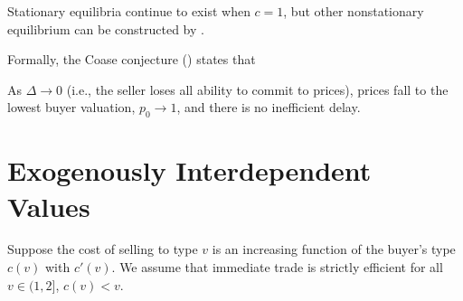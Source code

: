 \documentclass[11pt]{elegantbook}
\begin{document}
Stationary equilibria continue to exist when $c = 1$, but other nonstationary equilibrium can be constructed by \cite{ausubel1989reputation}.

Formally, the Coase conjecture (\cite{coase1972durability}) states that
\begin{proposition}
    As $\Delta \rightarrow 0$ (i.e., the seller loses all ability to commit to prices), prices fall to the lowest buyer valuation, $p_0 \rightarrow 1$, and there is no inefficient delay.
\end{proposition}


\section{Exogenously Interdependent Values}
Suppose the cost of selling to type $v$ is an increasing function of the buyer's type $c(v)$ with $c'(v)$. We assume that immediate trade is strictly efficient for all $v\in (1,2]$, $c(v)<v$.
\end{document}

